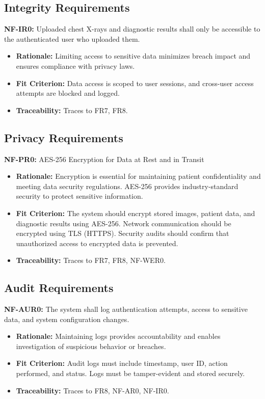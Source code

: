 \documentclass[12pt]{article}
\begin{document}
\subsection{Integrity Requirements}

\textbf{NF-IR0:} Uploaded chest X-rays and diagnostic results shall only be accessible to the authenticated user who uploaded them.
\begin{itemize}
    \item \textbf{Rationale:} Limiting access to sensitive data minimizes breach impact and ensures compliance with privacy laws.
    \item \textbf{Fit Criterion:} Data access is scoped to user sessions, and cross-user access attempts are blocked and logged.
    \item \textbf{Traceability:} Traces to FR7, FR8.
\end{itemize}

\subsection{Privacy Requirements}

\textbf{NF-PR0:} AES-256 Encryption for Data at Rest and in Transit
\begin{itemize}
    \item \textbf{Rationale:} Encryption is essential for maintaining patient confidentiality and meeting data security regulations. AES-256 provides industry-standard security to protect sensitive information.
    \item \textbf{Fit Criterion:} The system should encrypt stored images, patient data, and diagnostic results using AES-256. Network communication should be encrypted using TLS (HTTPS). Security audits should confirm that unauthorized access to encrypted data is prevented.
    \item \textbf{Traceability:} Traces to FR7, FR8, NF-WER0.
\end{itemize}

\subsection{Audit Requirements}

\textbf{NF-AUR0:} The system shall log authentication attempts, access to sensitive data, and system configuration changes.
\begin{itemize}
    \item \textbf{Rationale:} Maintaining logs provides accountability and enables investigation of suspicious behavior or breaches.
    \item \textbf{Fit Criterion:} Audit logs must include timestamp, user ID, action performed, and status. Logs must be tamper-evident and stored securely.
    \item \textbf{Traceability:} Traces to FR8, NF-AR0, NF-IR0.
\end{itemize}
\end{document}
